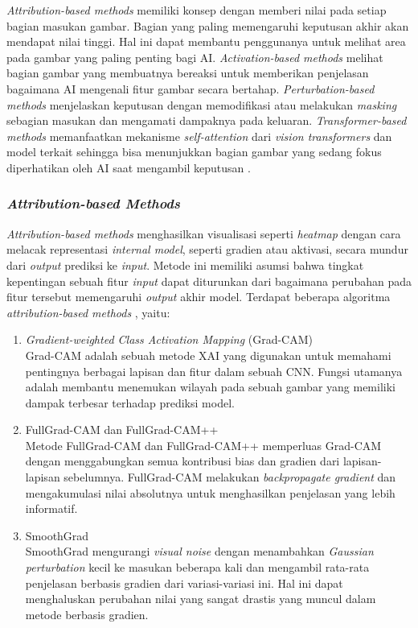 \textit{Attribution-based methods} memiliki konsep dengan memberi nilai pada setiap bagian masukan gambar. Bagian yang paling memengaruhi keputusan akhir akan mendapat nilai tinggi. Hal ini dapat membantu penggunanya untuk melihat area pada gambar yang paling penting bagi AI. \textit{Activation-based methods} melihat bagian gambar yang membuatnya bereaksi untuk memberikan penjelasan bagaimana AI mengenali fitur gambar secara bertahap. \textit{Perturbation-based methods} menjelaskan keputusan dengan memodifikasi atau melakukan \textit{masking} sebagian masukan dan mengamati dampaknya pada keluaran. \textit{Transformer-based methods} memanfaatkan mekanisme \textit{self-attention} dari \textit{vision transformers} dan model terkait sehingga bisa menunjukkan bagian gambar yang sedang fokus diperhatikan oleh AI saat mengambil keputusan \autocite{iftikhar2025explainable}.

\subsubsection{\textit{Attribution-based Methods}}
\textit{Attribution-based methods} menghasilkan visualisasi seperti \textit{heatmap} dengan cara melacak representasi \textit{internal model}, seperti gradien atau aktivasi, secara mundur dari \textit{output} prediksi ke \textit{input}. Metode ini memiliki asumsi bahwa tingkat kepentingan sebuah fitur \textit{input} dapat diturunkan dari bagaimana perubahan pada fitur tersebut memengaruhi \textit{output} akhir model. Terdapat beberapa algoritma \textit{attribution-based methods} \autocite{iftikhar2025explainable}, yaitu:

\begin{enumerate}
	\item \textit{Gradient-weighted Class Activation Mapping} (Grad-CAM)\\
	Grad-CAM adalah sebuah metode XAI yang digunakan untuk memahami pentingnya berbagai lapisan dan fitur dalam sebuah CNN. Fungsi utamanya adalah membantu menemukan wilayah pada sebuah gambar yang memiliki dampak terbesar terhadap prediksi model.
	
	\item FullGrad-CAM dan FullGrad-CAM++\\
	Metode FullGrad-CAM dan FullGrad-CAM++ memperluas Grad-CAM dengan menggabungkan semua kontribusi bias dan gradien dari lapisan-lapisan sebelumnya. FullGrad-CAM melakukan \textit{backpropagate gradient} dan mengakumulasi nilai absolutnya untuk menghasilkan penjelasan yang lebih informatif. 
	
	\item SmoothGrad\\
	SmoothGrad mengurangi \textit{visual noise} dengan menambahkan \textit{Gaussian perturbation} kecil ke masukan beberapa kali dan mengambil rata-rata penjelasan berbasis gradien dari variasi-variasi ini. Hal ini dapat menghaluskan perubahan nilai yang sangat drastis yang muncul dalam metode berbasis gradien.
	
\end{enumerate}

